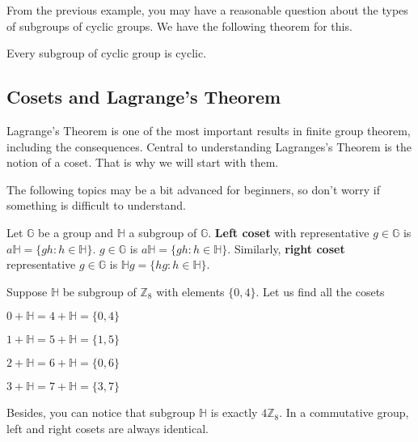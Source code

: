 \documentclass[../lecture-notes-148x210.tex]{subfiles}
\begin{document}
From the previous example, you may have a reasonable question about the types of subgroups 
of cyclic groups. We have the following theorem for this.

\begin{theorem}
    Every subgroup of cyclic group is cyclic.
\end{theorem}

\subsection{Cosets and Lagrange's Theorem}
 
Lagrange's Theorem is one of the most important results in finite group theorem, including 
the consequences. Central to understanding Lagranges's Theorem is the notion of a
coset. That is why we will start with them.

The following topics may be a bit advanced for beginners, so don't worry if something 
is difficult to understand.

\begin{definition}
    Let $\mathbb{G}$ be a group and $\mathbb{H}$ a subgroup of $\mathbb{G}$. \textbf{Left coset} 
    with representative $g \in \mathbb{G}$ is $a \mathbb{H} = \{gh : h \in \mathbb{H}\}$.
    $g \in \mathbb{G}$ is $a \mathbb{H} = \{gh : h \in \mathbb{H}\}$. Similarly, 
    \textbf{right coset} representative $g \in \mathbb{G}$ is $\mathbb{H}g = \{hg : h \in \mathbb{H}\}$.
\end{definition}

\begin{example}
    Suppose $\mathbb{H}$ be subgroup of $\mathbb{Z}_{8}$ with elements $\{0, 4\}$. 
    Let us find all the cosets
    \begin{center} %
        \vspace{-8mm}
        \item $0 + \mathbb{H} = 4 + \mathbb{H} = \{0, 4\}$
        \item $1 + \mathbb{H} = 5 + \mathbb{H} = \{1, 5\}$
        \item $2 + \mathbb{H} = 6 + \mathbb{H} = \{0, 6\}$
        \item $3 + \mathbb{H} = 7 + \mathbb{H} = \{3, 7\}$
    \end{center}
\end{example}

Besides, you can notice that subgroup $\mathbb{H}$ is exactly $4\mathbb{Z}_{8}$. In a commutative group, left and 
right cosets are always identical.
\end{document}
